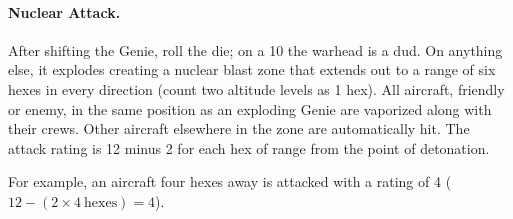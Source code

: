 \paragraph{Nuclear Attack.} After shifting the Genie, roll the die; on a 10 the warhead is a dud. On anything else, it explodes creating a nuclear blast zone that extends out to a range of six hexes in every direction (count two altitude levels as 1 hex). All aircraft, friendly or enemy, in the same position as an exploding Genie are vaporized along with their crews. Other aircraft elsewhere in the zone are automatically hit. The attack rating is 12 minus 2 for each hex of range from the point of detonation.

For example, an aircraft four hexes away is attacked with a rating of 4 ($12 - (2 \times 4\ \mathrm{hexes}) = 4$).
